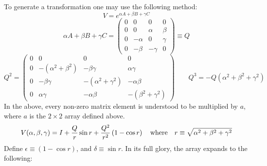 \documentclass[12pt]{article}
\begin{document}
 To generate a transformation one may use the following method:
$$V = e^{\alpha A + \beta B + \gamma C}$$
$$\alpha A + \beta B + \gamma C = \left( \begin{array}{cccc}
0 & 0 & 0 & 0 \\ 0 & 0 & \alpha & \beta \\ 0 & -\alpha & 0 & \gamma \\
0 & -\beta & -\gamma & 0 \end{array} \right) \equiv Q$$
$$Q^2 = \left( \begin{array}{cccc} 0 & 0 & 0 & 0 \\
0 & -(\alpha^2 + \beta^2) & -\beta \gamma & \alpha \gamma \\
0 & -\beta \gamma & -(\alpha^2 + \gamma^2) & -\alpha \beta \\
0 & \alpha \gamma & -\alpha \beta & -(\beta^2 + \gamma^2)  \end{array}
\right) \quad \quad Q^3 = -Q \left( \alpha^2 + \beta^2 + \gamma^2 \right)$$
 In the above, every non-zero matrix element is understood to be
multiplied by $a$, where $a$ is the $2 \times 2$ array defined above.
\begin{equation}
V(\alpha, \beta, \gamma) = I + {Q \over r} \sin{r} +
{Q^2 \over r^2} \left( 1 - \cos{r} \right) \quad {\rm where} \quad
r \equiv \sqrt{\alpha^2 + \beta^2 + \gamma^2}
\end{equation}
Define $\epsilon \equiv (1-\cos{r})$, and $\delta \equiv \sin{r}$.
In its full glory, the array expands to the following:
\end{document}
